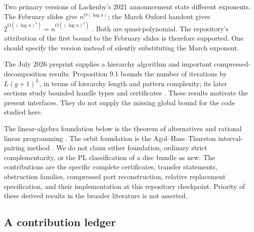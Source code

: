 \documentclass[11pt]{article}
\theoremstyle{definition}
\theoremstyle{remark}
\begin{document}
Two primary versions of Lackenby's 2021 announcement state different
exponents. The February slides give
\(n^{O(\log n)}\); the March Oxford handout gives
\(2^{O((\log n)^3)}=n^{O((\log n)^2)}\)
\cite{lackenby-feb,lackenby-mar}. Both are quasi-polynomial.
The repository's attribution of the first bound to the February slides is
therefore supported. One should specify the version instead of silently
substituting the March exponent.

The July 2026 preprint supplies a hierarchy algorithm and important
compressed-decomposition results. Proposition 9.1 bounds the number of
iterations by \(L(g+1)^L\), in terms of hierarchy length and pattern
complexity; its later sections study bounded handle types and certificates
\cite{lackenby2026}. These results motivate the present interfaces.
They do not supply the missing global bound for the code studied here.

The linear-algebra foundation below is the theorem of alternatives and
rational linear programming \cite{boyd,khachiyan}. The orbit foundation is the
Agol--Hass--Thurston interval-pairing method \cite{aht}. We do not claim either
foundation, ordinary strict complementarity, or the PL classification of
a disc bundle as new. The contributions are the specific complete
certificates, transfer statements, obstruction families, compressed
port reconstruction, relative replacement specification, and their
implementation at this repository checkpoint. Priority of these derived
results in the broader literature is not asserted.

\subsection{A contribution ledger}
\end{document}
